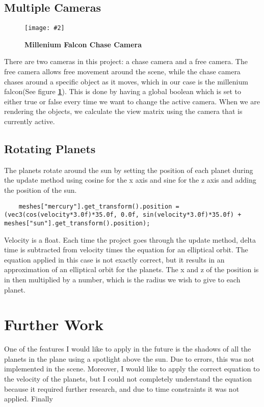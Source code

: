 \documentclass[10pt, a4paper]{article}
\newcommand{\figuremacro}[5]{
    \begin{figure}[#1]
        \centering
        \texttt{[image: \#2]}
        \caption[#3]{\textbf{#3}#4}
        \label{fig:#2}
    \end{figure}
}
\begin{document}
\subsection{Multiple Cameras}	
	
		\figuremacro{H}{Project_Falcon}{Millenium Falcon Chase Camera}{ }{1.0}
	
	There are two cameras in this project: a chase camera and a free camera. The free camera allows free movement around the scene, while the chase camera chases around a specific object as it moves, which in our case is the millenium falcon(See figure \textbf{\ref{fig:Project_Falcon}}). This is done by having a global boolean which is set to either true or false every time we want to change the active camera. When we are rendering the objects, we calculate the view matrix using the camera that is currently active. 
	
\subsection{Rotating Planets}	

	The planets rotate around the sun by setting the position of each planet during the update method using cosine for the x axis and sine for the z axis and adding the position of the sun.
	\begin{lstlisting}
	meshes["mercury"].get_transform().position = (vec3(cos(velocity*3.0f)*35.0f, 0.0f, sin(velocity*3.0f)*35.0f) + meshes["sun"].get_transform().position); 
	\end{lstlisting}
	 Velocity is a float. Each time the project goes through the update method, delta time is subtracted from velocity times the equation for an elliptical orbit. The equation applied in this case is not exactly correct, but it results in an approximation of an elliptical orbit for the planets. The x and z of the position is in then multiplied by a number, which is the radius we wish to give to each planet.
	 
\section{Further Work}	 
	
	One of the features I would like to apply in the future is the shadows of all the planets in the plane using a spotlight above the sun. Due to errors, this was not implemented in the scene. Moreover, I would like to apply the correct equation to the velocity of the planets, but I could not completely understand the equation because it required further research, and due to time constraints it was not applied. Finally
	
\end{document}
